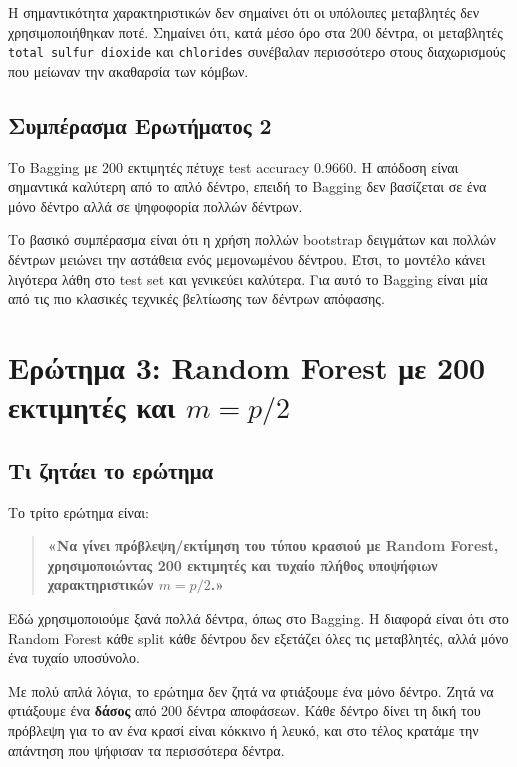 \documentclass[12pt,a4paper]{article}
\newcommand{\code}[1]{\texttt{\textenglish{#1}}}
\begin{document}
Η σημαντικότητα χαρακτηριστικών δεν σημαίνει ότι οι υπόλοιπες μεταβλητές δεν
χρησιμοποιήθηκαν ποτέ. Σημαίνει ότι, κατά μέσο όρο στα 200 δέντρα, οι
μεταβλητές \code{total sulfur dioxide} και \code{chlorides} συνέβαλαν
περισσότερο στους διαχωρισμούς που μείωναν την ακαθαρσία των κόμβων.

\subsection{Συμπέρασμα Ερωτήματος 2}

Το Bagging με 200 εκτιμητές πέτυχε test accuracy 0.9660. Η απόδοση είναι
σημαντικά καλύτερη από το απλό δέντρο, επειδή το Bagging δεν βασίζεται σε ένα
μόνο δέντρο αλλά σε ψηφοφορία πολλών δέντρων.

Το βασικό συμπέρασμα είναι ότι η χρήση πολλών bootstrap δειγμάτων και πολλών
δέντρων μειώνει την αστάθεια ενός μεμονωμένου δέντρου. Έτσι, το μοντέλο κάνει
λιγότερα λάθη στο test set και γενικεύει καλύτερα. Για αυτό το Bagging είναι
μία από τις πιο κλασικές τεχνικές βελτίωσης των δέντρων απόφασης.

\section{Ερώτημα 3: Random Forest με 200 εκτιμητές και \texorpdfstring{$m=p/2$}{m=p/2}}

\subsection{Τι ζητάει το ερώτημα}

Το τρίτο ερώτημα είναι:

\begin{quote}
\textbf{«Να γίνει πρόβλεψη/εκτίμηση του τύπου κρασιού με Random Forest,
χρησιμοποιώντας 200 εκτιμητές και τυχαίο πλήθος υποψήφιων χαρακτηριστικών
$m=p/2$.»}
\end{quote}

Εδώ χρησιμοποιούμε ξανά πολλά δέντρα, όπως στο Bagging. Η διαφορά είναι ότι
στο Random Forest κάθε split κάθε δέντρου δεν εξετάζει όλες τις μεταβλητές,
αλλά μόνο ένα τυχαίο υποσύνολο.

Με πολύ απλά λόγια, το ερώτημα δεν ζητά να φτιάξουμε ένα μόνο δέντρο.
Ζητά να φτιάξουμε ένα \textbf{δάσος} από 200 δέντρα αποφάσεων. Κάθε δέντρο
δίνει τη δική του πρόβλεψη για το αν ένα κρασί είναι κόκκινο ή λευκό, και στο
τέλος κρατάμε την απάντηση που ψήφισαν τα περισσότερα δέντρα.
\end{document}
